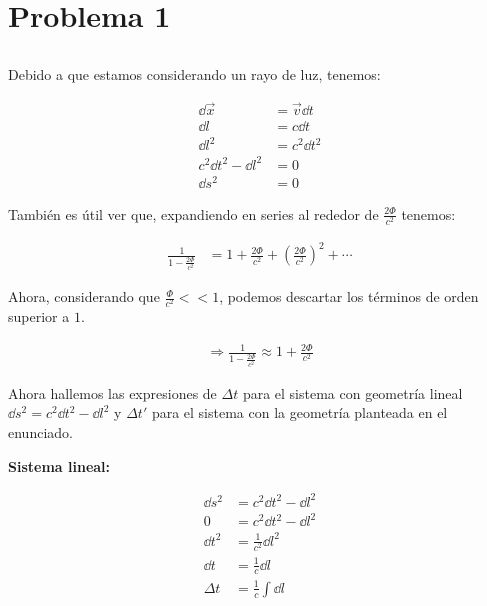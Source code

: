 \section{Problema 1}

\subsection{}

Debido a que estamos considerando un rayo de luz, tenemos:

\begin{align*}
    \dd \vec{x} &= \vec{v} \dd t\\
    \dd l   &= c \dd t\\
    \dd l^2 &= c^2 \dd t^2\\
    c^2 \dd t^2 - \dd l^2 &= 0\\
    \dd s^2 &= 0 \tag{1}
\end{align*}



También es útil ver que, expandiendo en series al rededor de $\frac{2\Phi}{c^2}$ tenemos:

\begin{align*}
    \frac{1}{1-\frac{2\Phi}{c^2}}
        &= 1 + \frac{2\Phi}{c^2}+\left(\frac{2\Phi}{c^2}\right)^2 + \cdots
\end{align*}

Ahora, considerando que $\frac{\Phi}{c^2}<<1$, podemos descartar los términos de orden superior a $1$.

\begin{align*}
    \Rightarrow \frac{1}{1-\frac{2\Phi}{c^2}} \approx 1+\frac{2\Phi}{c^2} \tag{2} \label{eq:exp}
\end{align*}

Ahora hallemos las expresiones de $\Delta t$ para el sistema con geometría lineal $\dd s^2 = c^2\dd t^2-\dd l^2$ y $\Delta t'$ para el sistema con la geometría planteada en el enunciado.

\bigskip

\textbf{Sistema lineal:}

\begin{align*}
    \dd s^2 
        &= c^2 \dd t^2 - \dd l^2\\
    0   &= c^2 \dd t^2 - \dd l^2\\
    \dd t^2 &= \frac{1}{c^2}\dd l^2\\
    \dd t &= \frac{1}{c}\dd l\\
    \Delta t &= \frac{1}{c}\int \dd l
\end{align*}

